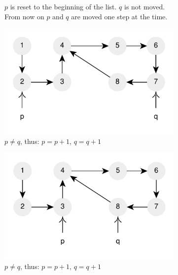 \begin{figure}
\begin{subfigure}[l]{0.36\textwidth}
		\caption{$p$ is reset to the beginning of the list. $q$ is not moved.  From now on $p$ and $q$ are moved one step at the time.}
		\label{fig:cycle_in_list:floyd7}
	 \end{subfigure}
	 \hfill
	 \begin{subfigure}[l]{0.36\textwidth}
		\includegraphics[width=1\linewidth]{sources/cycle_in_list/images/floyd8}
		\caption{$p \neq q$,  thus: $p=p+1$, $q=q+1$}
		\label{fig:cycle_in_list:floyd8}
	 \end{subfigure}
	 \hfill
	 \begin{subfigure}[l]{0.36\textwidth}
		\includegraphics[width=1\linewidth]{sources/cycle_in_list/images/floyd9}
		\caption{$p \neq q$,  thus: $p=p+1$, $q=q+1$}
		\label{fig:cycle_in_list:floyd9}
	 \end{subfigure}
	 \hfill
	 \begin{subfigure}[l]{0.36\textwidth}

\end{subfigure}
\end{figure}
